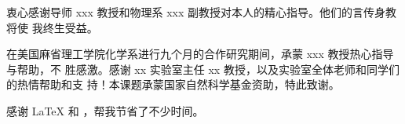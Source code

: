 
\begin{acknowledgements}
  衷心感谢导师 xxx 教授和物理系 xxx 副教授对本人的精心指导。他们的言传身教将使
  我终生受益。

  在美国麻省理工学院化学系进行九个月的合作研究期间，承蒙 xxx 教授热心指导与帮助，不
  胜感激。感谢 xx 实验室主任 xx 教授，以及实验室全体老师和同学们的热情帮助和支
  持！本课题承蒙国家自然科学基金资助，特此致谢。

  感谢 \LaTeX{} 和 \thuthesis，帮我节省了不少时间。
\end{acknowledgements}
